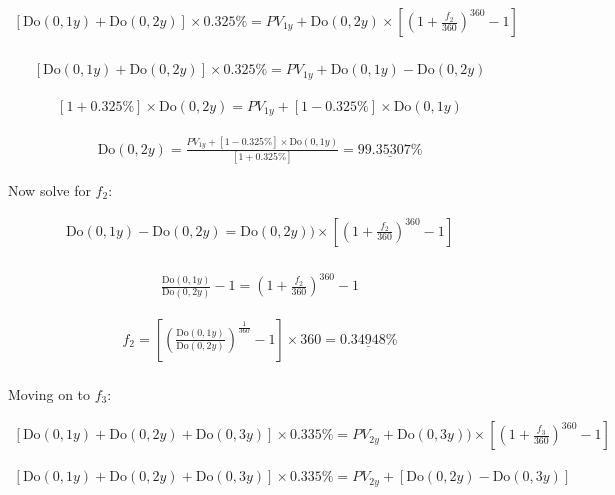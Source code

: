 \documentclass[12pt]{article}
\begin{document}
\begin{gather*}
\left[\text{Do}(0, 1y) + \text{Do}(0, 2y)\right] \times 0.325\% = PV_{1y}^{} + \text{Do}(0, 2y) \times \left[\left(1 + \frac{f_2}{360}\right)^{360} - 1\right]\\
\end{gather*}

\begin{gather*}
\left[\text{Do}(0, 1y) + \text{Do}(0, 2y)\right] \times 0.325\% = PV_{1y}^{} + \text{Do}(0, 1y) - \text{Do}(0, 2y)
\end{gather*}

\begin{gather*}
\left[1+0.325\%\right] \times \text{Do}(0, 2y) = PV_{1y}^{} + \left[1-0.325\%\right] \times \text{Do}(0, 1y)
\end{gather*}

\begin{gather*}
\text{Do}(0, 2y) =
\frac{PV_{1y}^{} + \left[1-0.325\%\right] \times \text{Do}(0, 1y)}{\left[1+0.325\%\right]} = \underline{99.35307\%}
\end{gather*}

\noindent Now solve for \(f_2\):

\begin{gather*}
\text{Do}(0, 1y) - \text{Do}(0, 2y) = \text{Do}(0, 2y)) \times \left[\left(1 + \frac{f_2}{360}\right)^{360} - 1\right]\\
\end{gather*}

\begin{gather*}
\frac{\text{Do}(0, 1y)}{\text{Do}(0, 2y)} - 1= \left(1 + \frac{f_2}{360}\right)^{360} - 1
\end{gather*}

\begin{gather*}
f_2 = \left[\left(\frac{\text{Do}(0, 1y)}{\text{Do}(0, 2y)}\right)^{\frac{1}{360}} -1 \right] \times 360 = \underline{0.34948\%}\\
\end{gather*}

\noindent Moving on to \(f_3\):

\begin{gather*}
\left[\text{Do}(0, 1y) + \text{Do}(0, 2y) + \text{Do}(0, 3y)\right] \times 0.335\% = PV_{2y}^{} + 
\text{Do}(0, 3y)) \times \left[\left(1 + \frac{f_3}{360}\right)^{360} - 1\right]
\end{gather*}

\begin{gather*}
\left[\text{Do}(0, 1y) + \text{Do}(0, 2y) + \text{Do}(0, 3y)\right] \times 0.335\% = PV_{2y}^{} + 
\left[ \text{Do}(0, 2y) -  \text{Do}(0, 3y)\right]
\end{gather*}
\end{document}
